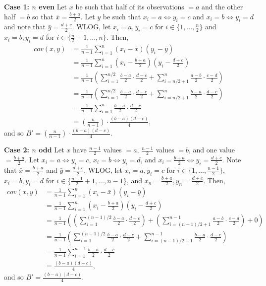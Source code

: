 \documentclass[11pt]{scrartcl} %
\begin{document}
\textbf{Case 1: $n$ even} \newline
Let $x$ be such that half of its observations $= a$ and the other half $= b$ so that
$\bar{x} = \frac{b+a}{2}$.
Let $y$ be such that $x_i = a \iff y_i = c$ and $x_i = b \iff y_i = d$ and note that
$\bar{y} = \frac{d+c}{2}$. WLOG, let $x_i=a, y_i=c$ for $i \in \{1,\hdots,\frac{n}{2}\}$ and
$x_i=b, y_i=d$ for $i \in \{\frac{n}{2}+1,\hdots,n\}$. Then,
\begin{align*}
	cov(x,y) &= \frac{1}{n-1} \sum_{i=1}^{n}(x_i-\bar{x})(y_i-\bar{y}) \\
			 &= \frac{1}{n-1} \sum_{i=1}^{n}\left(x_i-\frac{b+a}{2}\right)\left(y_i-\frac{d+c}{2}\right) \\
			 &= \frac{1}{n-1} \left( \sum_{i=1}^{n/2} \frac{b-a}{2} \cdot \frac{d-c}{2} + \sum_{i=n/2 + 1}^{n}\frac{a-b}{2} \cdot \frac{c-d}{2} \right) \\
			 &= \frac{1}{n-1} \left( \sum_{i=1}^{n/2} \frac{b-a}{2} \cdot \frac{d-c}{2} + \sum_{i=n/2 + 1}^{n}\frac{b-a}{2} \cdot \frac{d-c}{2} \right) \\
			 &= \frac{1}{n-1} \sum_{i=1}^{n} \frac{b-a}{2} \cdot \frac{d-c}{2} \\
			 &= \left( \frac{n}{n-1} \right) \cdot \frac{(b-a)(d-c)}{4},
\end{align*}
and so $B' = \left( \frac{n}{n-1} \right) \cdot \frac{(b-a)(d-c)}{4}$. \newline

\textbf{Case 2: $n$ odd} \newline
Let $x$ have $\frac{n-1}{2}$ values $=a$, $\frac{n-1}{2}$ values $=b$, and one value $=\frac{b+a}{2}$.
Let $x_i=a \iff y_i=c$, $x_i=b \iff y_i=d$, and $x_i=\frac{b+a}{2} \iff y_i=\frac{d+c}{2}$.
Note that $\bar{x} = \frac{b+a}{2}$ and $\bar{y} = \frac{d+c}{2}$. WLOG, let
$x_i=a, y_i=c$ for $i \in \{1,\hdots,\frac{n-1}{2}\}$,
$x_i=b, y_i=d$ for $i \in \{\frac{n-1}{2}+1,\hdots,n-1\}$, and
$x_n =\frac{b+a}{2}, y_n=\frac{d+c}{2}$. Then,
\begin{align*}
	cov(x,y) &= \frac{1}{n-1} \sum_{i=1}^{n}(x_i-\bar{x})(y_i-\bar{y}) \\
			 &= \frac{1}{n-1} \sum_{i=1}^{n}\left(x_i-\frac{b+a}{2}\right)\left(y_i-\frac{d+c}{2}\right) \\
			 &= \frac{1}{n-1} \left( \left( \sum_{i=1}^{(n-1)/2} \frac{b-a}{2} \cdot \frac{d-c}{2} \right) + \left( \sum_{i=(n-1)/2 + 1}^{n-1}\frac{a-b}{2} \cdot \frac{c-d}{2}\right) + 0 \right) \\
			 &= \frac{1}{n-1} \left( \sum_{i=1}^{(n-1)/2} \frac{b-a}{2} \cdot \frac{d-c}{2} + \sum_{i=(n-1)/2 + 1}^{n-1}\frac{b-a}{2} \cdot \frac{d-c}{2} \right) \\
			 &= \frac{1}{n-1} \sum_{i=1}^{n-1} \frac{b-a}{2} \cdot \frac{d-c}{2} \\
			 &= \frac{(b-a)(d-c)}{4},
\end{align*}
and so $B' = \frac{(b-a)(d-c)}{4}$.
\end{document}
